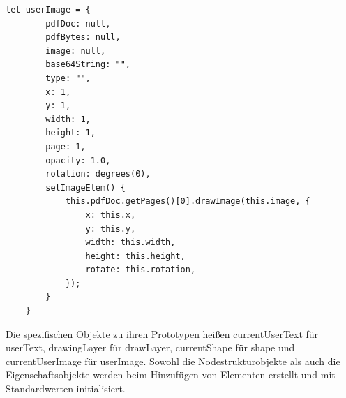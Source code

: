 \begin{lstlisting}[style=ES6, caption={Prototyp-Objekt für die imagespezifischen Eigenschaften}, label=code:user-image, breaklines=true]
	let userImage = {
		pdfDoc: null,
		pdfBytes: null,
		image: null,
		base64String: "",
		type: "",
		x: 1,
		y: 1,
		width: 1,
		height: 1,
		page: 1,
		opacity: 1.0,
		rotation: degrees(0),
		setImageElem() {
			this.pdfDoc.getPages()[0].drawImage(this.image, {
				x: this.x,
				y: this.y,
				width: this.width,
				height: this.height,
				rotate: this.rotation,
			});
		}
	}
\end{lstlisting}

Die spezifischen Objekte zu ihren Prototypen heißen currentUserText für userText, drawingLayer für drawLayer, currentShape für shape und currentUserImage für userImage. Sowohl die Nodestrukturobjekte als auch die Eigenschaftsobjekte werden beim Hinzufügen von Elementen erstellt und mit Standardwerten initialisiert. 

